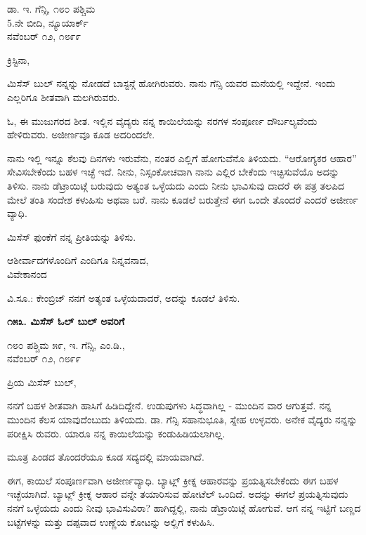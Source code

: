 \begin{flushright}
 ಡಾ. ಇ. ಗೆನ್ಸಿ, ೧೮೦ ಪಶ್ಚಿಮ\\5.ನೇ ಬೀದಿ, ನ್ಯೂಯಾರ್ಕ್\\ನವೆಂಬರ್ ೧೨, ೧೮೯೯
\end{flushright}

ಕ್ರಿಸ್ಟಿನಾ,

ಮಿಸೆಸ್ ಬುಲ್ ನನ್ನನ್ನು ನೋಡದೆ ಬಾಸ್ಟನ್ಗೆ ಹೋಗಿರುವರು. ನಾನು ಗೆನ್ಸಿ ಯವರ ಮನೆಯಲ್ಲಿ ಇದ್ದೇನೆ. ಇಂದು ಎಲ್ಲರಿಗೂ ಶೀತವಾಗಿ ಮಲಗಿರುವರು.

ಓ, ಈ ಮುಜುಗರದ ಶೀತ. ಇಲ್ಲಿನ ವೈದ್ಯರು ನನ್ನ ಕಾಯಿಲೆಯನ್ನು ನರಗಳ ಸಂಪೂರ್ಣ ದೌರ್ಬಲ್ಯವೆಂದು ಹೇಳಿರುವರು. ಅಜೀರ್ಣವೂ ಕೂಡ ಅದರಿಂದಲೇ.

ನಾನು ಇಲ್ಲಿ ಇನ್ನೂ ಕೆಲವು ದಿನಗಳು ಇರುವೆನು, ನಂತರ ಎಲ್ಲಿಗೆ ಹೋಗುವೆನೊ ತಿಳಿಯದು. “ಆರೋಗ್ಯಕರ ಆಹಾರ” ಸೇವಿಸಬೇಕೆಂದು ಬಹಳ ಇಚ್ಛೆ ಇದೆ. ನೀನು, ನಿಸ್ಸಂಕೋಚವಾಗಿ ನಾನು ಎಲ್ಲಿರ ಬೇಕೆಂದು ಇಚ್ಛಿಸುವೆಯೊ ಅದನ್ನು ತಿಳಿಸು. ನಾನು ಡೆಟ್ರಾಯಿಟ್ಗೆ ಬರುವುದು ಅತ್ಯಂತ ಒಳ್ಳೆಯದು ಎಂದು ನೀನು ಭಾವಿಸುವು ದಾದರೆ ಈ ಪತ್ರ ತಲಪಿದ ಮೇಲೆ ತಂತಿ ಸಂದೇಶ ಕಳುಹಿಸು ಅಥವಾ ಬರೆ. ನಾನು ಕೂಡಲೆ ಬರುತ್ತೇನೆ ಈಗ ಒಂದೇ ತೊಂದರೆ ಎಂದರೆ ಅಜೀರ್ಣ ವ್ಯಾಧಿ.

ಮಿಸೆಸ್ ಫುಂಕೆಗೆ ನನ್ನ ಪ್ರೀತಿಯನ್ನು ತಿಳಿಸು.

\begin{flushright}
ಆಶೀರ್ವಾದಗಳೊಂದಿಗೆ ಎಂದಿಗೂ ನಿನ್ನವನಾದ,\\ವಿವೇಕಾನಂದ
\end{flushright}

ವಿ.ಸೂ.: ಕೇಂಬ್ರಿಜ್ ನನಗೆ ಅತ್ಯಂತ ಒಳ್ಳೆಯದಾದರೆ, ಅದನ್ನು ಕೂಡಲೆ ತಿಳಿಸು.

\begin{center}
\textbf{೧೫೩. ಮಿಸೆಸ್ ಓಲ್ ಬುಲ್ ಅವರಿಗೆ}
\end{center}

\begin{flushright}
೧೮೦ ಪಶ್ಚಿಮ ೫೯,  ಇ. ಗೆನ್ಸಿ, ಎಂ.ಡಿ.,\\ನವೆಂಬರ್ ೧೨, ೧೮೯೯
\end{flushright}

ಪ್ರಿಯ ಮಿಸೆಸ್ ಬುಲ್,

ನನಗೆ ಬಹಳ ಶೀತವಾಗಿ ಹಾಸಿಗೆ ಹಿಡಿದಿದ್ದೇನೆ. ಉಡುಪುಗಳು ಸಿದ್ಧವಾಗಿಲ್ಲ - ಮುಂದಿನ ವಾರ ಆಗುತ್ತವೆ. ನನ್ನ ಮುಂದಿನ ಕೆಲಸ ಯಾವುದೆಂಬುದು ತಿಳಿಯದು. ಡಾ. ಗೆನ್ಸಿ ಸಹಾನುಭೂತಿ, ಸ್ನೇಹ ಉಳ್ಳವರು. ಅನೇಕ ವೈದ್ಯರು ನನ್ನನ್ನು ಪರೀಕ್ಷಿಸಿ ರುವರು. ಯಾರೂ ನನ್ನ ಕಾಯಿಲೆಯನ್ನು ಕಂಡುಹಿಡಿಯಲಾಗಿಲ್ಲ.

ಮೂತ್ರ ಪಿಂಡದ ತೊಂದರೆಯೂ ಕೂಡ ಸದ್ಯದಲ್ಲಿ ಮಾಯವಾಗಿದೆ.

ಈಗ, ಕಾಯಿಲೆ ಸಂಪೂರ್ಣವಾಗಿ ಅಜೀರ್ಣವ್ಯಾಧಿ. ಬ್ಯಾಟ್ಲ್ ಕ್ರೀಕ್ನ ಆಹಾರವನ್ನು ಪ್ರಯತ್ನಿಸಬೇಕೆಂದು ಈಗ ಬಹಳ ಇಚ್ಛೆಯಾಗಿದೆ. ಬ್ಯಾಟ್ಲ್ ಕ್ರೀಕ್ನ ಆಹಾರ ವನ್ನೇ ತಯಾರಿಸುವ ಹೋಟೆಲ್ ಒಂದಿದೆ. ಅದನ್ನು ಈಗಲೆ ಪ್ರಯತ್ನಿಸುವುದು ನನಗೆ ಒಳ್ಳೆಯದು ಎಂದು ನೀವು ಭಾವಿಸುವಿರಾ? ಹಾಗಿದ್ದಲ್ಲಿ, ನಾನು ಡೆಟ್ರಾಯಿಟ್ಗೆ ಹೋಗುವೆ. ಆಗ ನನ್ನ ಇಟ್ಟಿಗೆ ಬಣ್ಣದ ಬಟ್ಟೆಗಳನ್ನು ಮತ್ತು ದಪ್ಪವಾದ ಉಣ್ಣೆಯ ಕೋಟನ್ನು ಅಲ್ಲಿಗೆ ಕಳುಹಿಸಿ.

